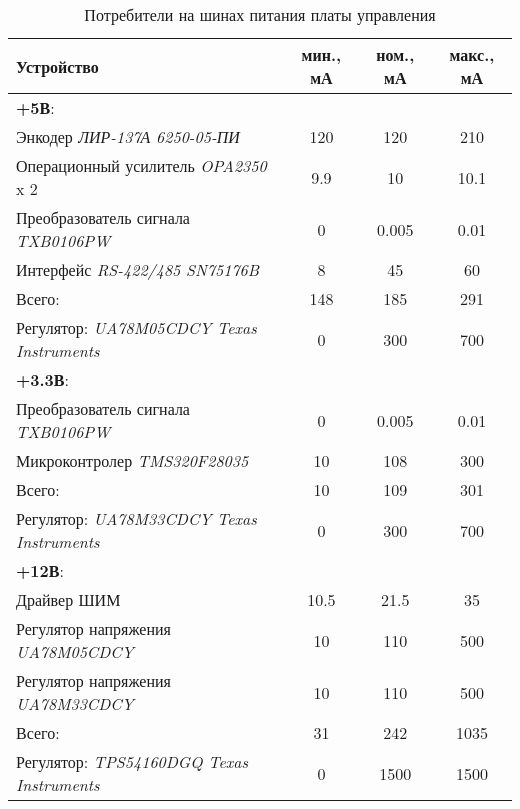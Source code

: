 \begin{table}[ht!]
    \centering
    \begin{tabular}{|l|c|c|c|}
        \hline
        Устройство & мин., мА & ном., мА  & макс., мА \\
        \hline \hline
        \textbf{+5В}: &&& \\
        Энкодер \textit{ЛИР-137А 6250-05-ПИ}        & 120 & 120   & 210  \\
        Операционный усилитель \textit{OPA2350} x 2 & 9.9 & 10    & 10.1 \\
        Преобразователь сигнала \textit{TXB0106PW}  & 0   & 0.005 & 0.01 \\
        Интерфейс \textit{RS-422/485 SN75176B}      & 8   & 45    & 60   \\
        \hline
        Всего: & 148 & 185 & 291 \\
        \hline
        Регулятор:
        \textit{UA78M05CDCY Texas Instruments} & 0 & 300 & 700 \\

        \hline \hline
        \textbf{+3.3В}: &&& \\
        Преобразователь сигнала \textit{TXB0106PW} & 0  & 0.005 & 0.01 \\
        Микроконтролер \textit{TMS320F28035}       & 10 & 108   & 300  \\
        \hline
        Всего: & 10 & 109 & 301 \\
        \hline
        Регулятор:
        \textit{UA78M33CDCY Texas Instruments} & 0 & 300 & 700 \\

        \hline \hline
        \textbf{+12В}: &&& \\
        Драйвер ШИМ                               & 10.5 & 21.5 & 35  \\
        Регулятор напряжения \textit{UA78M05CDCY} & 10   & 110  & 500 \\
        Регулятор напряжения \textit{UA78M33CDCY} & 10   & 110  & 500 \\
        \hline
        Всего: & 31 & 242 & 1035 \\
        \hline
        Регулятор:
        \textit{TPS54160DGQ Texas Instruments} & 0 & 1500 & 1500 \\

        \hline
    \end{tabular}
    \caption{Потребители на шинах питания платы управления}
    \label{powerConsumersOnBoard}
\end{table}

